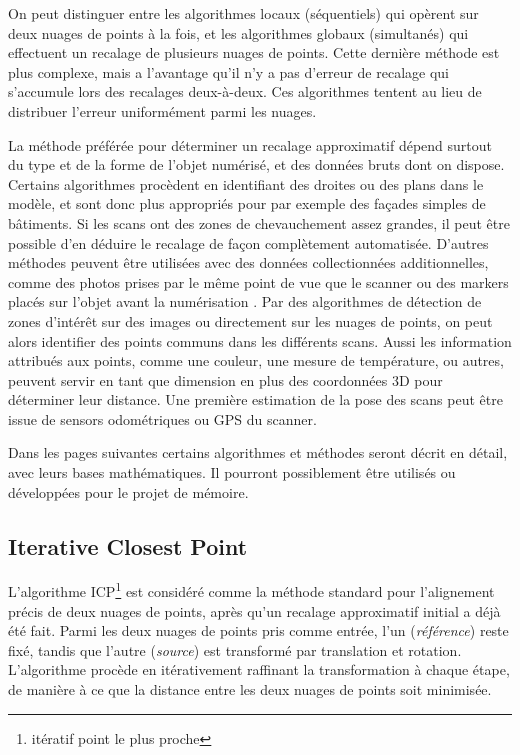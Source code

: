 \documentclass[a4paper,10pt]{scrreprt}
\begin{document}
On peut distinguer entre les algorithmes locaux (séquentiels) qui opèrent sur deux nuages de points à la fois, et les algorithmes globaux (simultanés) qui effectuent un recalage de plusieurs nuages de points. Cette dernière méthode est plus complexe, mais a l'avantage qu'il n'y a pas d'erreur de recalage qui s'accumule lors des recalages deux-à-deux. Ces algorithmes tentent au lieu de distribuer l'erreur uniformément parmi les nuages.

La méthode préférée pour déterminer un recalage approximatif dépend surtout du type et de la forme de l'objet numérisé, et des données bruts dont on dispose. Certains algorithmes procèdent en identifiant des droites \cite{Lich2011} ou des plans \cite{Dold2006} dans le modèle, et sont donc plus appropriés pour par exemple des façades simples de bâtiments. Si les scans ont des zones de chevauchement assez grandes, il peut être possible d'en déduire le recalage de façon complètement automatisée. D'autres méthodes peuvent être utilisées avec des données collectionnées additionnelles, comme des photos prises par le même point de vue que le scanner \cite{Tour2009} ou des markers placés sur l'objet avant la numérisation \cite{Mati2011}. Par des algorithmes de détection de zones d'intérêt \cite{Tuyt2007} sur des images ou directement sur les nuages de points, on peut alors identifier des points communs dans les différents scans. Aussi les information attribués aux points, comme une couleur, une mesure de température, ou autres, peuvent servir en tant que dimension en plus des coordonnées 3D pour déterminer leur distance. Une première estimation de la pose des scans peut être issue de sensors odométriques ou GPS du scanner.

Dans les pages suivantes certains algorithmes et méthodes seront décrit en détail, avec leurs bases mathématiques. Il pourront possiblement être utilisés ou développées pour le projet de mémoire.



\subsection{Iterative Closest Point}
L'algorithme ICP\footnote{itératif point le plus proche} est considéré comme la méthode standard pour l'alignement précis de deux nuages de points, après qu'un recalage approximatif initial a déjà été fait. Parmi les deux nuages de points pris comme entrée, l'un (\emph{référence}) reste fixé, tandis que l'autre (\emph{source}) est transformé par translation et rotation. L'algorithme procède en itérativement raffinant la transformation à chaque étape, de manière à ce que la distance entre les deux nuages de points soit minimisée.
\end{document}
